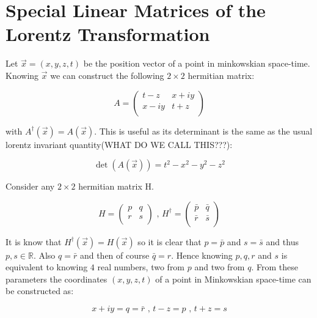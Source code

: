 \section{Special Linear Matrices of the Lorentz Transformation}

Let $\vec{x} = (x,y,z,t)$ be the position vector of a point in minkowskian space-time. Knowing $\vec{x}$ we can construct the following $2 \times 2$ hermitian matrix:

\begin{equation*}
A = 
\left( 
\begin{array}{cc}
t-z    & x + i y \\
x - iy & t+z \\
\end{array} 
\right)  
\end{equation*}

\noindent with $A^{\dagger}(\vec{x}) = A(\vec{x})$. This is useful as its determinant is the same as the usual lorentz invariant quantity(WHAT DO WE CALL THIS???):

\begin{equation*}
\det(A(\vec{x})) = t^2 - x^2 - y^2 - z^2
\end{equation*}

Consider any $2 \times 2$ hermitian matrix H. 

\begin{equation*}
H = \left( \begin{array}{cc}
p & q \\
r & s \\
\end{array} \right) \text{ ,     }
H^{\dagger} = \left( \begin{array}{cc}
\bar{p} & \bar{q} \\
\bar{r} & \bar{s} \\
\end{array} \right)
\end{equation*}

\noindent It is know that $H^{\dagger}(\vec{x}) = H(\vec{x})$ so it is clear that $p = \bar{p}$ and $s = \bar{s}$ and thus $p,s \in \mathbb{R}$. Also $q = \bar{r}$ and then of course $\bar{q} = r$. Hence knowing $p,q,r$ and $s$ is equivalent to knowing $4$ real numbers, two from $p$ and two from $q$. From these parameters the coordinates $(x,y,z,t)$ of a point in Minkowskian space-time can be constructed as:

\begin{equation*}
x + iy = q = \bar{r} \text{ ,   } t - z = p \text{ ,   } t+z = s
\end{equation*}

